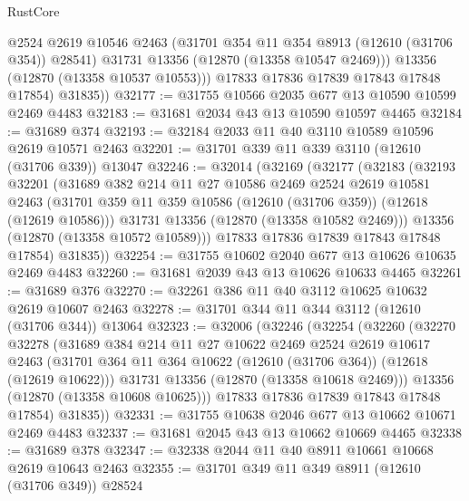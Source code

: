\begin{lexlean}{RustCore}
\begin{coremodule}
              @2524
              @2619
              @10546
              @2463
              (@31701 @354 @11 @354 @8913 (@12610 (@31706 @354)) @28541)
              @31731
              @13356
              (@12870 (@13358 @10547 @2469)))
            @13356
            (@12870 (@13358 @10537 @10553)))
          @17833
          @17836
          @17839
          @17843
          @17848
          @17854)
        @31835))
@32177 := @31755 @10566 @2035 @677 @13 @10590 @10599 @2469 @4483
@32183 := @31681 @2034 @43 @13 @10590 @10597 @4465
@32184 := @31689 @374
@32193 := @32184 @2033 @11 @40 @3110 @10589 @10596 @2619 @10571 @2463
@32201 := @31701 @339 @11 @339 @3110 (@12610 (@31706 @339)) @13047
@32246 := @32014
    (@32169
      (@32177
        (@32183
          (@32193
            @32201
            (@31689
              @382
              @214
              @11
              @27
              @10586
              @2469
              @2524
              @2619
              @10581
              @2463
              (@31701 @359 @11 @359 @10586 (@12610 (@31706 @359)) (@12618 (@12619 @10586)))
              @31731
              @13356
              (@12870 (@13358 @10582 @2469)))
            @13356
            (@12870 (@13358 @10572 @10589)))
          @17833
          @17836
          @17839
          @17843
          @17848
          @17854)
        @31835))
@32254 := @31755 @10602 @2040 @677 @13 @10626 @10635 @2469 @4483
@32260 := @31681 @2039 @43 @13 @10626 @10633 @4465
@32261 := @31689 @376
@32270 := @32261 @386 @11 @40 @3112 @10625 @10632 @2619 @10607 @2463
@32278 := @31701 @344 @11 @344 @3112 (@12610 (@31706 @344)) @13064
@32323 := @32006
    (@32246
      (@32254
        (@32260
          (@32270
            @32278
            (@31689
              @384
              @214
              @11
              @27
              @10622
              @2469
              @2524
              @2619
              @10617
              @2463
              (@31701 @364 @11 @364 @10622 (@12610 (@31706 @364)) (@12618 (@12619 @10622)))
              @31731
              @13356
              (@12870 (@13358 @10618 @2469)))
            @13356
            (@12870 (@13358 @10608 @10625)))
          @17833
          @17836
          @17839
          @17843
          @17848
          @17854)
        @31835))
@32331 := @31755 @10638 @2046 @677 @13 @10662 @10671 @2469 @4483
@32337 := @31681 @2045 @43 @13 @10662 @10669 @4465
@32338 := @31689 @378
@32347 := @32338 @2044 @11 @40 @8911 @10661 @10668 @2619 @10643 @2463
@32355 := @31701 @349 @11 @349 @8911 (@12610 (@31706 @349)) @28524

\end{coremodule}
\end{lexlean}
